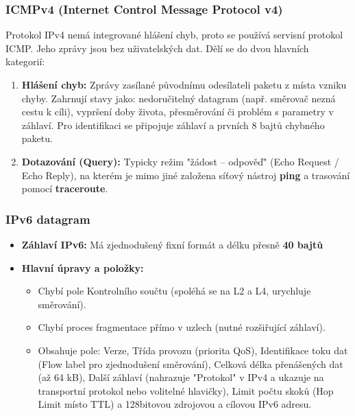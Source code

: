         \subsubsection{ICMPv4 (Internet Control Message Protocol v4)}
            Protokol IPv4 nemá integrované hlášení chyb, proto se používá servisní protokol ICMP. Jeho zprávy jsou bez uživatelských dat. Dělí se do dvou hlavních kategorií:
            \begin{enumerate}
                \item \textbf{Hlášení chyb:} Zprávy zasílané původnímu odesílateli paketu z místa vzniku chyby. Zahrnují stavy jako: nedoručitelný datagram (např. směrovač nezná cestu k cíli), vypršení doby života, přesměrování či problém s parametry v záhlaví. Pro identifikaci se připojuje záhlaví a prvních 8 bajtů chybného paketu.
                \item \textbf{Dotazování (Query):} Typicky režim "žádost -- odpověď" (Echo Request / Echo Reply), na kterém je mimo jiné založena síťový nástroj \textbf{ping} a trasování pomocí \textbf{traceroute}.
            \end{enumerate}
    \subsubsection{IPv6 datagram}
        \begin{itemize}
            \item \textbf{Záhlaví IPv6:} Má zjednodušený fixní formát a délku přesně \textbf{40 bajtů}
            \item \textbf{Hlavní úpravy a položky:}
            \begin{itemize}
                \item Chybí pole Kontrolního součtu (spoléhá se na L2 a L4, urychluje směrování).
                \item Chybí proces fragmentace přímo v uzlech (nutné rozšiřující záhlaví).
                \item Obsahuje pole: Verze, Třída provozu (priorita QoS), Identifikace toku dat (Flow label pro zjednodušení směrování), Celková délka přenášených dat (až 64 kB), Další záhlaví (nahrazuje "Protokol" v IPv4 a ukazuje na transportní protokol nebo volitelné hlavičky), Limit počtu skoků (Hop Limit místo TTL) a 128bitovou zdrojovou a cílovou IPv6 adresu.
            \end{itemize}
        \end{itemize}
